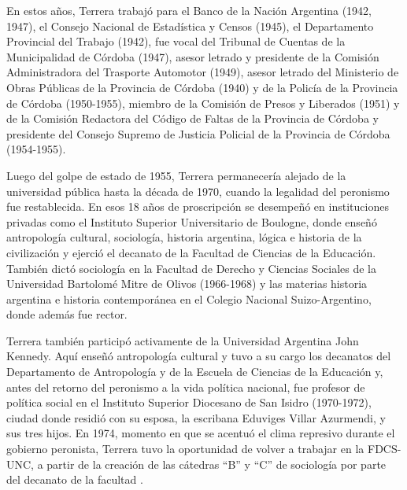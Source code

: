 En estos años, Terrera trabajó para el Banco de la Nación Argentina (1942, 1947), el Consejo Nacional de Estadística y Censos (1945), el Departamento Provincial del Trabajo (1942), fue vocal del Tribunal de Cuentas de la Municipalidad de Córdoba (1947), asesor letrado y presidente de la Comisión Administradora del Trasporte Automotor (1949), asesor letrado del Ministerio de Obras Públicas de la Provincia de Córdoba (1940) y de la Policía de la Provincia de Córdoba (1950-1955), miembro de la Comisión de Presos y Liberados (1951) y de la Comisión Redactora del Código de Faltas de la Provincia de Córdoba y presidente del Consejo Supremo de Justicia Policial de la Provincia de Córdoba (1954-1955).

Luego del golpe de estado de 1955, Terrera permanecería alejado de la universidad pública hasta la década de 1970, cuando la legalidad del peronismo fue restablecida. En esos 18 años de proscripción se desempeñó en instituciones privadas como el Instituto Superior Universitario de Boulogne, donde enseñó antropología cultural, sociología, historia argentina, lógica e historia de la civilización y ejerció el decanato de la Facultad de Ciencias de la Educación. También dictó sociología en la Facultad de Derecho y Ciencias Sociales de la Universidad Bartolomé Mitre de Olivos (1966-1968) y las materias historia argentina e historia contemporánea en el Colegio Nacional Suizo-Argentino, donde además fue rector.

Terrera también participó activamente de la Universidad Argentina John Kennedy. Aquí enseñó antropología cultural y tuvo a su cargo los decanatos del Departamento de Antropología y de la Escuela de Ciencias de la Educación y, antes del retorno del peronismo a la vida política nacional, fue profesor de política social en el Instituto Superior Diocesano de San Isidro (1970-1972), ciudad donde residió con su esposa, la escribana Eduviges Villar Azurmendi, y sus tres hijos. En 1974, momento en que se acentuó el clima represivo durante el gobierno peronista, Terrera tuvo la oportunidad de volver a trabajar en la FDCS-UNC, a partir de la creación de las cátedras \enquote{B} y \enquote{C} de sociología por parte del decanato de la facultad \parencite{1558-CHAMORROGRECA2007}.

